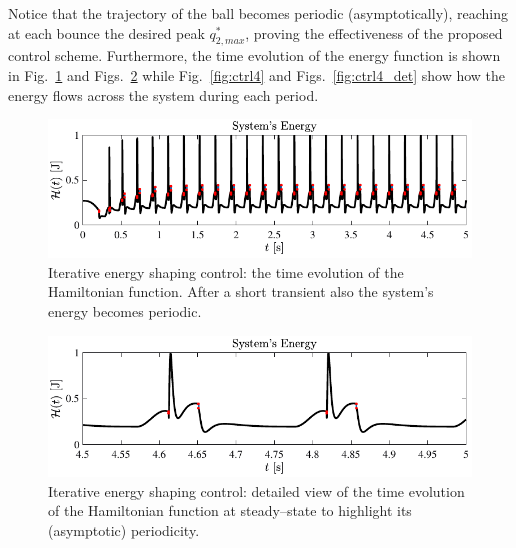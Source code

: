 %
%
Notice that the trajectory of the ball becomes periodic (asymptotically), reaching at each bounce the desired peak $q_{2,max}^*$, proving the effectiveness of the proposed control scheme. Furthermore, the time evolution of the energy function is shown in Fig.~\ref{fig:ctrl3} and Figs.~\ref{fig:ctrl3_det} while Fig.~\ref{fig:ctrl4} and Figs.~\ref{fig:ctrl4_det} show how the energy flows across the system during each period. 
%
\begin{figure}[!b]
	\centering
	\includegraphics[width=\linewidth]{Figures/ctrl3.pdf}
	\caption[Iterative energy shaping control: the time evolution of the Hamiltonian function]{Iterative energy shaping control: the time evolution of the Hamiltonian function. After a short transient also the system's energy becomes periodic.}
	\label{fig:ctrl3}
\end{figure}
%
\begin{figure}[!ht]
	\centering
	\includegraphics[width=\linewidth]{Figures/ctrl3_det.pdf}
	\caption[Iterative energy shaping control: detailed view of the the Hamiltonian at steady--state]{Iterative energy shaping control: detailed view of the time evolution of the Hamiltonian function at steady--state to highlight its (asymptotic) periodicity.}
	\label{fig:ctrl3_det}
\end{figure}
%
